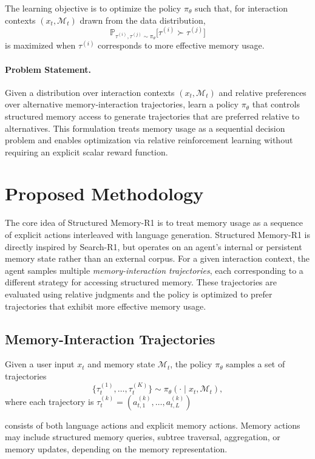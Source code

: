 \documentclass{article}
\begin{document}
The learning objective is to optimize the policy $\pi_\theta$ such that, for interaction contexts $(x_t, \mathcal{M}_t)$ drawn from the data distribution,
\[
\mathbb{P}_{\tau^{(i)}, \tau^{(j)} \sim \pi_\theta}
\big[ \tau^{(i)} \succ \tau^{(j)} \big]
\]
is maximized when $\tau^{(i)}$ corresponds to more effective memory usage.

\paragraph{Problem Statement.}
Given a distribution over interaction contexts $(x_t, \mathcal{M}_t)$ and relative preferences over alternative memory-interaction trajectories, learn a policy $\pi_\theta$ that controls structured memory access to generate trajectories that are preferred relative to alternatives. This formulation treats memory usage as a sequential decision problem and enables optimization via relative reinforcement learning without requiring an explicit scalar reward function.


\section{Proposed Methodology}

The core idea of Structured Memory-R1 is to treat memory usage as a sequence of explicit actions interleaved with language generation. Structured Memory-R1 is directly inspired by Search-R1, but operates on an agent’s internal or persistent memory state rather than an external corpus. For a given interaction context, the agent samples multiple \emph{memory-interaction trajectories}, each corresponding to a different strategy for accessing structured memory. These trajectories are evaluated using relative judgments and the policy is optimized to prefer trajectories that exhibit more effective memory usage.

\subsection{Memory-Interaction Trajectories}
Given a user input $x_t$ and memory state $\mathcal{M}_t$, the policy $\pi_\theta$ samples a set of trajectories
\[
\{ \tau_t^{(1)}, \ldots, \tau_t^{(K)} \} \sim \pi_\theta(\cdot \mid x_t, \mathcal{M}_t),
\]
where each trajectory is
$\tau_t^{(k)} = (a_{t,1}^{(k)}, \ldots, a_{t,L}^{(k)})$

consists of both language actions and explicit memory actions. Memory actions may include structured memory queries, subtree traversal, aggregation, or memory updates, depending on the memory representation.
\end{document}

